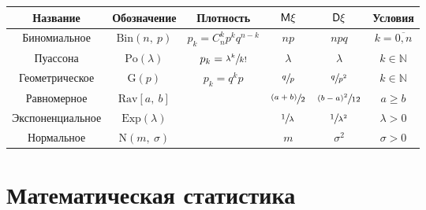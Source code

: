 \begin{tabu}{|c|c|c|c|c|c|}
	\hline
		Название&Обозначение&Плотность&$\mathsf{M}\xi$&$\mathsf{D}\xi$&Условия \\
	\hline
		Биномиальное&
		$\mathrm{Bin}(n,\ p)$&
		$p_k = C_n^k p^k q^{n-k}$&
		$np$&
		$npq$&
		$k=\overline{0, n}$ \\
	\hline
		Пуассона&
		$\mathrm{Po}(\lambda)$&
		$p_k = \sfrac{\lambda^k}{k!}$&
		$\lambda$&
		$\lambda$&
		$k\in \mathbb{N}$ \\
	\hline
		Геометрическое&
		$\mathrm{G}(p)$&
		$p_k = q^k p$&
		$\sfrac{q}{p}$&
		$\sfrac{q}{p^2}$&
		$k\in \mathbb{N}$ \\
	\hline
		Равномерное&
		$\mathrm{Rav}[a,\ b]$&
		&
		$\sfrac{(a+b)}{2}$&
		$\sfrac{(b-a)^2}{12}$&
		$a \geqslant b$ \\
	\hline
		Экспоненциальное&
		$\mathrm{Exp}(\lambda)$&
		&
		$\sfrac{1}{\lambda}$&
		$\sfrac{1}{\lambda^2}$&
		$\lambda > 0$ \\
	\hline
		Нормальное&
		$\mathrm{N}(m,\ \sigma)$&
		&
		$m$&
		$\sigma^2$&
		$\sigma > 0$ \\
	\hline
\end{tabu}

\section{Математическая статистика}